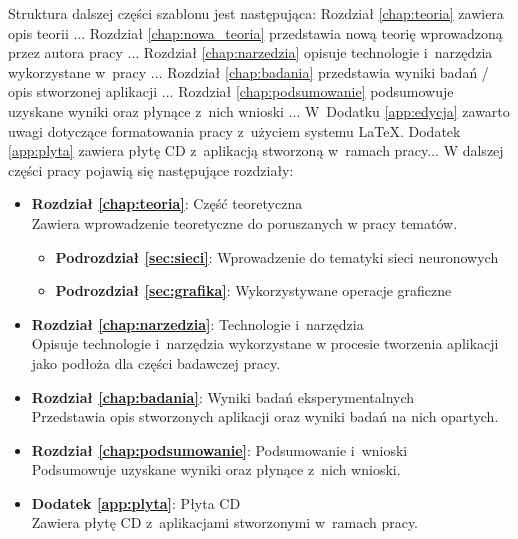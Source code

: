 Struktura dalszej części szablonu jest następująca: Rozdział \ref{chap:teoria} zawiera opis teorii ... Rozdział \ref{chap:nowa_teoria} przedstawia nową teorię wprowadzoną przez autora pracy ... Rozdział \ref{chap:narzedzia} opisuje technologie i~narzędzia wykorzystane w~pracy ...  Rozdział \ref{chap:badania} przedstawia wyniki badań / opis stworzonej aplikacji ... Rozdział \ref{chap:podsumowanie} podsumowuje uzyskane wyniki oraz płynące z~nich wnioski ... W~Dodatku \ref{app:edycja} zawarto uwagi dotyczące formatowania pracy z~użyciem systemu \LaTeX. Dodatek \ref{app:plyta} zawiera płytę CD z~aplikacją stworzoną w~ramach pracy...
\fi
W dalszej części pracy pojawią się następujące rozdziały:
\begin {itemize}
\item \textbf{Rozdział \ref{chap:teoria}}: Część teoretyczna\\
Zawiera wprowadzenie teoretyczne do poruszanych w pracy tematów.
\begin {itemize}
\item \textbf{Podrozdział \ref{sec:sieci}}: Wprowadzenie do tematyki sieci neuronowych
\item \textbf{Podrozdział \ref{sec:grafika}}: Wykorzystywane operacje graficzne
\end{itemize}
\item \textbf{Rozdział \ref{chap:narzedzia}}: Technologie i~narzędzia\\
Opisuje technologie i~narzędzia wykorzystane w procesie tworzenia aplikacji jako podłoża dla części badawczej pracy.
\item \textbf{Rozdział \ref{chap:badania}}: Wyniki badań eksperymentalnych\\
Przedstawia opis stworzonych aplikacji oraz wyniki badań na nich opartych.
\item \textbf{Rozdział \ref{chap:podsumowanie}}: Podsumowanie i~wnioski\\
Podsumowuje uzyskane wyniki oraz płynące z~nich wnioski.
\item \textbf{Dodatek \ref{app:plyta}}: Płyta CD\\
Zawiera płytę CD z~aplikacjami stworzonymi w~ramach pracy.
\end{itemize}
